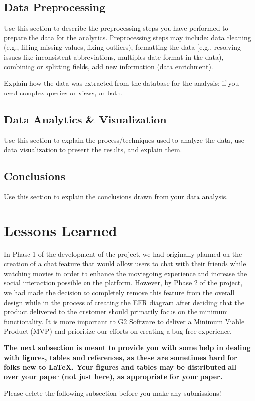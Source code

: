 \documentclass[12pt]{article}
\begin{document}
    \subsection{Data Preprocessing}
    Use this section to describe the preprocessing steps you have performed to prepare the data for the analytics. Preprocessing steps may include: data cleaning (e.g., filling missing values, fixing outliers), formatting the data (e.g., resolving issues like inconsistent abbreviations, multiples date format in the data), combining or splitting fields, add new information (data enrichment).

    Explain how the data was extracted from the database for the analysis; if you used complex queries or views, or both.

    \subsection{Data Analytics \& Visualization}
    Use this section to explain the process/techniques used to analyze the data, use data visualization to present the results, and explain them.

    \subsection{Conclusions}
    Use this section to explain the conclusions drawn from your data analysis.\\


    \section{Lessons Learned}
    In Phase 1 of the development of the project, we had originally planned on the creation of a chat feature that would allow users to chat with their friends while watching movies in order to enhance the moviegoing experience and increase the social interaction possible on the platform. However, by Phase 2 of the project, we had made the decision to completely remove this feature from the overall design while in the process of creating the EER diagram after deciding that the product delivered to the customer should primarily focus on the minimum functionality. It is more important to G2 Software to deliver a Minimum Viable Product (MVP) and prioritize our efforts on creating a bug-free experience.\\

    {\bf The next subsection is meant to provide you with some help in
    dealing with figures, tables and references, as these are sometimes
    hard for folks new to \LaTeX. Your figures and tables
    may be distributed all over your paper (not just here), as appropriate for your paper.

    Please delete the following subsection before you make any submissions!}
\end{document}
